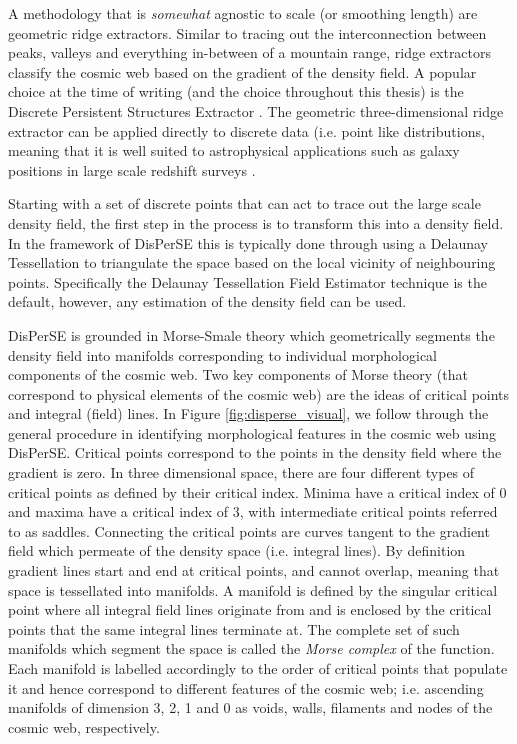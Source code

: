 A methodology that is \textit{somewhat} agnostic to scale (or smoothing length) are geometric ridge extractors. Similar to tracing out the interconnection between peaks, valleys and everything in-between of a mountain range, ridge extractors classify the cosmic web based on the gradient of the density field. A popular choice at the time of writing (and the choice throughout this thesis) is the Discrete Persistent Structures Extractor \citep[DisPerSE][]{sousbie2011a, sousbie2011b}. The geometric three-dimensional ridge extractor can be applied directly to discrete data (i.e. point like distributions, meaning that it is well suited to astrophysical applications such as galaxy positions in large scale redshift surveys \citep[e.g.][]{malavasi2017, kraljic2018}.

Starting with a set of discrete points that can act to trace out the large scale density field, the first step in the process is to transform this into a density field. In the framework of DisPerSE this is typically done through using a Delaunay Tessellation to triangulate the space based on the local vicinity of neighbouring points. Specifically the Delaunay Tessellation Field Estimator technique \citep[DTFE;][]{schaap2000, cautun2011} is the default, however, any estimation of the density field can be used. 

DisPerSE is grounded in Morse-Smale theory which geometrically segments the density field into manifolds corresponding to individual morphological components of the cosmic web. Two key components of Morse theory (that correspond to physical elements of the cosmic web) are the ideas of critical points and integral (field) lines. In Figure \ref{fig:disperse_visual}, we follow through the general procedure in identifying morphological features in the cosmic web using DisPerSE. Critical points correspond to the points in the density field where the gradient is zero. In three dimensional space, there are four different types of critical points as defined by their critical index. Minima have a critical index of 0 and maxima have a critical index of 3, with intermediate critical points referred to as saddles. Connecting the critical points are curves tangent to the gradient field which permeate of the density space (i.e. integral lines). By definition gradient lines start and end at critical points, and cannot overlap, meaning that space is tessellated into manifolds. A manifold is defined by the singular critical point where all integral field lines originate from and is enclosed by the critical points that the same integral lines terminate at. The complete set of such manifolds which segment the space is called the \textit{Morse complex} of the function. Each manifold is labelled accordingly to the order of critical points that populate it and hence correspond to different features of the cosmic web; i.e. ascending manifolds of dimension 3, 2, 1 and 0 as voids, walls, filaments and nodes of the cosmic web, respectively. 

